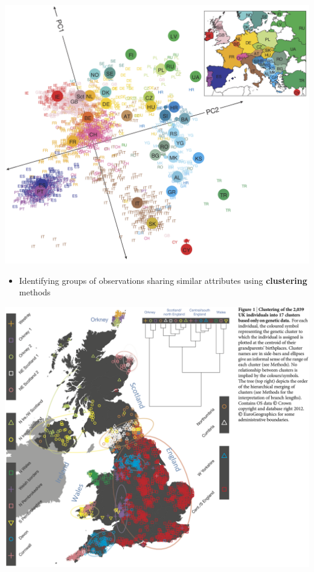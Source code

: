\documentclass[]{book}
\providecommand{\tightlist}{%
  \setlength{\itemsep}{0pt}\setlength{\parskip}{0pt}}
\begin{document}
\begin{center}\includegraphics[width=600px]{_img//01-dimensionality} \end{center}

\begin{itemize}
\tightlist
\item
  Identifying groups of observations sharing similar attributes using \textbf{clustering} methods
\end{itemize}

\begin{center}\includegraphics[width=600px]{_img//01-clustering} \end{center}
\end{document}
